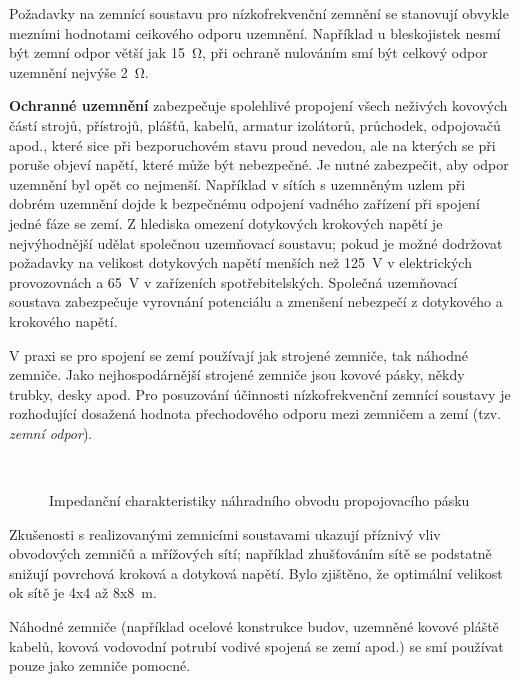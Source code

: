       Požadavky na zemnící soustavu pro nízkofrekvenční zemnění se stanovují obvykle mezními
      hodnotami ceikového odporu uzemnění. Například u bleskojistek nesmí být zemní odpor větší jak
      \qty{15}{\ohm}, při ochraně nulováním smí být celkový odpor uzemnění nejvýše \qty{2}{\ohm}. 

      \textbf{Ochranné uzemnění} zabezpečuje spolehlivé propojení všech neživých kovových částí
      strojů, přístrojů, plášťů, kabelů, armatur izolátorů, průchodek, odpojovačů apod., které sice
      při bezporuchovém stavu proud nevedou, ale na kterých se při poruše objeví napětí, které může
      být nebezpečné. Je nutné zabezpečit, aby odpor uzemnění byl opět co nejmenší. Například v
      sítích s uzemněným uzlem při dobrém uzemnění dojde k bezpečnému odpojení vadného zařízení při
      spojení jedné fáze se zemí. Z hlediska omezení dotykových krokových napětí je nejvýhodnější
      udělat společnou uzemňovací soustavu; pokud je možné dodržovat požadavky na velikost
      dotykových napětí menších než \qty{125}{\V} v elektrických provozovnách a \qty{65}{\V} v
      zařízeních spotřebitelských. Společná uzemňovací soustava zabezpečuje vyrovnání potenciálu a
      zmenšení nebezpečí z dotykového a krokového napětí. 

      V praxi se pro spojení se zemí používají jak strojené zemniče, tak náhodné zemniče. Jako
      nejhospodárnější strojené zemniče jsou kovové pásky, někdy trubky, desky apod. Pro posuzování
      účinnosti nízkofrekvenční zemnící soustavy je rozhodující dosažená hodnota přechodového odporu
      mezi zemničem a zemí (tzv. \emph{zemní odpor}). 

      \begin{figure}[ht!]
        \centering  
         \\
        \caption{Impedanční charakteristiky náhradního obvodu propojovacího pásku}
        \label{emc:fig001}
      \end{figure}

      Zkušenosti s realizovanými zemnicími soustavami ukazují příznivý vliv obvodových zemničů a
      mřížových sítí; například zhušťováním sítě se podstatně snižují povrchová kroková a dotyková
      napětí. Bylo zjištěno, že optimální velikost ok sítě je 4x4 až 8x\qty{8}{\m}. 

      Náhodné zemniče (například ocelové konstrukce budov, uzemněné kovové pláště kabelů, kovová
      vodovodní potrubí vodivé spojená se zemí apod.) se smí používat pouze jako zemniče pomocné.
      
